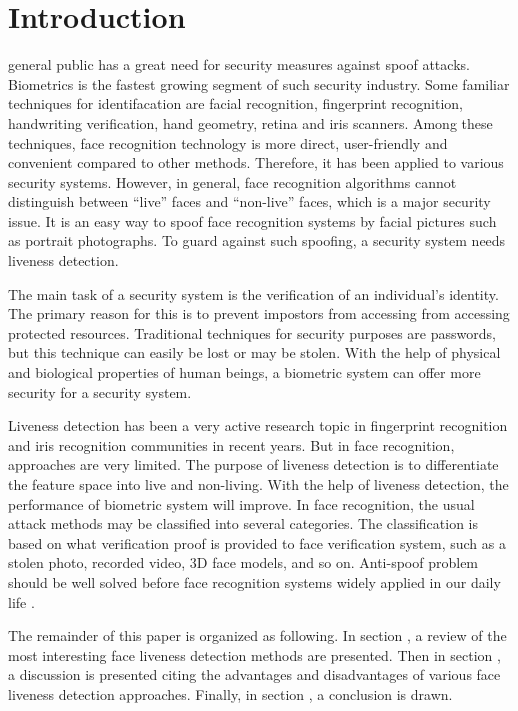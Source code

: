 \documentclass[journal]{IEEEtran}
\begin{document}
\section{Introduction}

  general public has a great need for security measures against spoof attacks. Biometrics is the fastest growing segment of such security industry. Some familiar techniques for identifacation are facial recognition, fingerprint recognition, handwriting verification, hand geometry, retina and iris scanners. Among these techniques, face recognition technology is more direct, user-friendly and convenient compared to other methods. Therefore, it has been applied to various security systems. However, in general, face recognition algorithms cannot distinguish between “live” faces and “non-live” faces, which is a major security issue. It is an easy way to spoof face recognition systems by facial pictures such as portrait photographs. To guard against such spoofing, a security system needs liveness detection.

The main task of a security system is the verification of an individual's identity. The primary reason for this is to prevent impostors from accessing from accessing protected resources. Traditional techniques for security purposes are passwords, but this technique can easily be lost or may be stolen. With the help of physical and biological properties of human beings, a biometric system can offer more security for a security system.

Liveness detection has been a very active research topic in fingerprint recognition and iris recognition communities in recent years. But in face recognition, approaches are very limited. The purpose of liveness detection is to differentiate the feature space into live and non-living. With the help of liveness detection, the performance of biometric system will improve. In face recognition, the usual attack methods may be classified into several categories. The classification is based on what verification proof is provided to face verification system, such as a stolen photo, recorded video, 3D face models, and so on. Anti-spoof problem should be well solved before face recognition systems widely applied in our daily life \cite{chakraborty2014overview}.

The remainder of this paper is organized as following. In section \uppercase\expandafter{}, a review of the most interesting face liveness detection methods are presented. Then in section \uppercase\expandafter{}, a discussion is presented citing the advantages and disadvantages of various face liveness detection approaches. Finally, in section \uppercase\expandafter{}, a conclusion is drawn.
\end{document}
